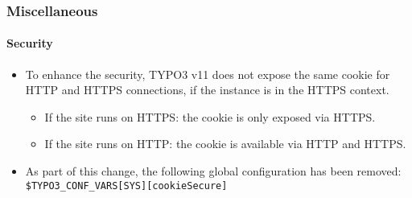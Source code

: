 %

\begin{frame}[fragile]
	\frametitle{Miscellaneous}
	\framesubtitle{Security}

	\begin{itemize}
		\item To enhance the security, TYPO3 v11 does not expose the same cookie
			for HTTP and HTTPS connections, if the instance is in the HTTPS context.

			\begin{itemize}
				\item If the site runs on HTTPS: the cookie is only exposed via HTTPS.
				\item If the site runs on HTTP: the cookie is available via HTTP and HTTPS.
			\end{itemize}

		\item As part of this change, the following global configuration has been removed:
		 	\smaller\texttt{\$TYPO3\_CONF\_VARS[SYS][cookieSecure]}\normalsize

	\end{itemize}

\end{frame}

